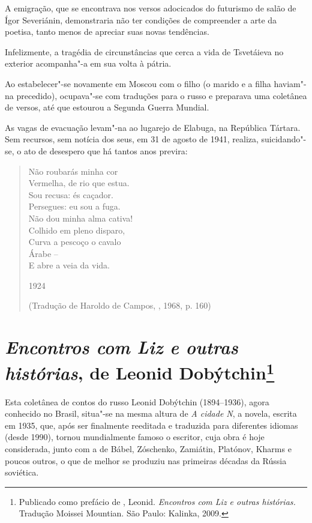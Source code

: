 A emigração, que se encontrava nos versos adocicados do
futurismo de salão de Ígor Severiánin, demonstraria não ter
condições de compreender a arte da poetisa, tanto menos de
apreciar suas novas tendências.

Infelizmente, a tragédia de circunstâncias que cerca a vida de
Tsvetáieva no exterior acompanha"-a em sua volta à pátria.

Ao estabelecer"-se novamente em Moscou com o filho (o marido e a
filha haviam"-na precedido), ocupava"-se com traduções para o
russo e preparava uma coletânea de versos, até que estourou a
Segunda Guerra Mundial.

As vagas de evacuação levam"-na ao lugarejo de Elabuga, na
República Tártara. Sem recursos, sem notícia dos seus, em 31
de agosto de 1941, realiza, suicidando"-se, o ato de desespero
que há tantos anos previra:

\begin{verse}
Não roubarás minha cor \\
Vermelha, de rio que estua. \\
Sou recusa: és caçador. \\
Persegues: eu sou a fuga. \\[8pt]
Não dou minha alma cativa! \\
Colhido em pleno disparo, \\
Curva a pescoço o cavalo \\
Árabe -- \\
E abre a veia da vida. 

1924

(Tradução de Haroldo de Campos, , 1968, p. 160)

\end{verse}

\chapter{\emph{Encontros com Liz e outras histórias}, de Leonid
Dobýtchin\footnote{Publicado como prefácio de {},
Leonid. \emph{Encontros com Liz e outras histórias.} Tradução
Moissei Mountian. São Paulo: Kalinka, 2009.}}

Esta coletânea de contos do russo Leonid Dobýtchin (1894--1936), agora
conhecido no Brasil, situa"-se na mesma altura de \emph{A cidade N}, a
novela, escrita em 1935, que, após ser finalmente reeditada e traduzida
para diferentes idiomas (desde 1990), tornou mundialmente famoso o
escritor, cuja obra é hoje considerada, junto com a de Bábel, Zóschenko,
Zamiátin, Platónov, Kharms e poucos outros, o que de melhor se produziu
nas primeiras décadas da Rússia soviética.

